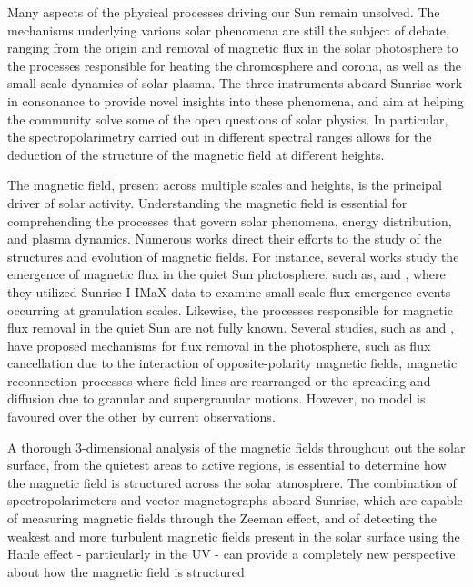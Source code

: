Many aspects of the physical processes driving our Sun remain unsolved. The mechanisms underlying various solar phenomena are still the subject of debate, ranging from the origin and removal of magnetic flux in the solar photosphere to the processes responsible for heating the chromosphere and corona, as well as the small-scale dynamics of solar plasma. The three instruments aboard Sunrise work in consonance to provide novel insights into these phenomena, and aim at helping the community solve some of the open questions of solar physics. In particular, the spectropolarimetry carried out in different spectral ranges allows for the deduction of the structure of the magnetic field at different heights. 

The magnetic field, present across multiple scales and heights, is the principal driver of solar activity. Understanding the magnetic field is essential for comprehending the processes that govern solar phenomena, energy distribution, and plasma dynamics. Numerous works direct their efforts to the study of the structures and evolution of magnetic fields. For instance, several works study  the emergence of magnetic flux in the quiet Sun photosphere, such as, \cite{flux_emergence_1} and \cite{flux_emergence_2}, where they utilized Sunrise I IMaX data to examine small-scale flux emergence events occurring at granulation scales. Likewise, the processes responsible for magnetic flux removal in the quiet Sun are not fully known. Several studies, such as \cite{flux_removal_1} and \cite{flux_emergence_2}, have proposed mechanisms for flux removal in the photosphere, such as flux cancellation due to the interaction of opposite-polarity magnetic fields, magnetic reconnection processes where field lines are rearranged or the spreading and diffusion due to granular and supergranular motions. However, no model is favoured over the other by current observations.

A thorough 3-dimensional analysis of the magnetic fields throughout out the solar surface, from the quietest areas to active regions, is essential to determine how the magnetic field is structured across the solar atmosphere. The combination of spectropolarimeters and vector magnetographs aboard Sunrise, which are capable of measuring magnetic fields through the Zeeman effect, and of detecting the weakest and more turbulent \citep{quiet_sun_living_review} magnetic fields present in the solar surface using the Hanle effect - particularly in the UV - can provide a completely new perspective about how the magnetic field is structured 

